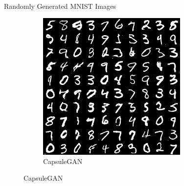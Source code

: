 \documentclass{beamer}
\begin{document}
{\begin{frame}{Randomly Generated MNIST Images}
\begin{figure}
\begin{subfigure}{.49\textwidth}
          \includegraphics[width=\textwidth]{../img/capsgan_mnist_randomly_generated.png}
          \caption{CapsuleGAN}
          \label{fig:capsgan_mnist_randomly_generated}
        \end{subfigure}
      \end{figure}
    \end{frame}

}
\end{document}
